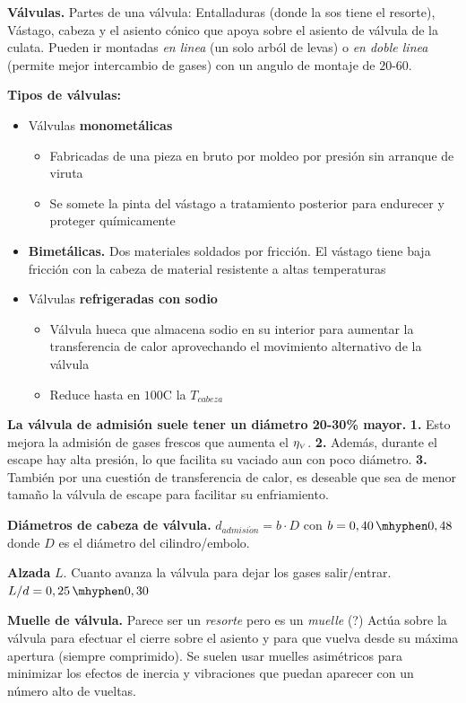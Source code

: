 \textbf{Válvulas.} Partes de una válvula: Entalladuras (donde la sos tiene el resorte), Vástago, cabeza y el asiento cónico que apoya sobre el asiento de válvula de la culata. Pueden ir montadas \textit{en linea} (un solo arból de levas) o \textit{en doble linea} (permite mejor intercambio de gases) con un angulo de montaje de $20$-$60$\grad.

\textbf{Tipos de válvulas:}
\begin{itemize}
    \item Válvulas \textbf{monometálicas}
    \begin{itemize}
        \item Fabricadas de una pieza en bruto por moldeo por presión sin arranque de viruta
        \item Se somete la pinta del vástago a tratamiento posterior para endurecer y proteger químicamente
    \end{itemize}
    \item \textbf{Bimetálicas.} Dos materiales soldados por fricción. El vástago tiene baja fricción con la cabeza de material resistente a altas temperaturas
    \item Válvulas \textbf{refrigeradas con sodio}
    \begin{itemize}
        \item Válvula hueca que almacena sodio en su interior para aumentar la transferencia de calor aprovechando el movimiento alternativo de la válvula
        \item Reduce hasta en $100$\grad C la $T_{cabeza}$
\end{itemize}
\end{itemize}
    \textbf{La válvula de admisión suele tener un diámetro 20-30\% mayor.} \textbf{1.} Esto mejora la admisión de gases frescos que aumenta el $\eta_{{\mbox{\tiny$V$}}}$. \textbf{2.} Además, durante el escape hay alta presión, lo que facilita su vaciado aun con poco diámetro. \textbf{3.} También por una cuestión de transferencia de calor, es deseable que sea de menor tamaño la válvula de escape para facilitar su enfriamiento.
    
    \textbf{Diámetros de cabeza de válvula.} $d_{admisi\acute{o}n}=b\cdot D$ con $b=0,40\hyph0,48$ donde $D$ es el diámetro del cilindro/embolo.
    
    \textbf{Alzada} $L$. Cuanto avanza la válvula para dejar los gases salir/entrar. $L/d=0,25\hyph0,30$

\textbf{Muelle de válvula.} Parece ser un \textit{resorte} pero es un \textit{muelle} (?) Actúa sobre la válvula para efectuar el cierre sobre el asiento y para que vuelva desde su máxima apertura (siempre comprimido). Se suelen usar muelles asimétricos para minimizar los efectos de inercia y vibraciones que puedan aparecer con un número alto de vueltas.   


